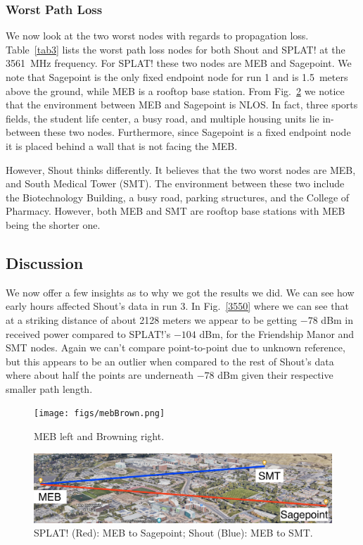 \subsubsection{Worst Path Loss}
We now look at the two worst nodes with regards to propagation loss. Table~\ref{tab3} lists the worst path loss nodes for both 
Shout and SPLAT! at the 3561~MHz frequency. For SPLAT! these two nodes are MEB and Sagepoint. We note that Sagepoint 
is the only fixed endpoint node for run 1 and is 1.5~meters above the ground, while MEB is a rooftop base station. From 
Fig.~\ref{worst} we notice that the environment between MEB and Sagepoint is NLOS. In fact, three sports fields, the student
life center, a busy road, and multiple housing units lie in-between these two nodes. Furthermore, since Sagepoint is a 
fixed endpoint node it is placed behind a wall that is not facing the MEB. 

However, Shout thinks differently. It believes that the two worst nodes are MEB, and South Medical Tower (SMT). The environment
between these two include the Biotechnology Building, a busy road, parking structures, and the College of Pharmacy.
However, both MEB and SMT are rooftop base stations with MEB being the shorter one. 

\subsection{Discussion}
We now offer a few insights as to why we got the results we did. We can see how early hours affected Shout's data in run 3. 
In Fig.~\ref{3550} where we can see that at a striking distance of about 2128 meters we appear to be getting $-78$ dBm 
in received power compared to SPLAT!'s $-104$ dBm, for the Friendship Manor and SMT nodes. Again we can't compare 
point-to-point due to unknown reference, but this appears to be an outlier
when compared to the rest of Shout's data where 
about half the points are underneath $-78$ dBm given their respective smaller path length.

\begin{figure}[htbp]
\centerline{\texttt{[image: figs/mebBrown.png]}}
\caption{MEB left and Browning right.}
\label{mebBrown}
\vspace{-3mm}
\end{figure}

\begin{figure}[htbp]
\centerline{\includegraphics[width=0.9\columnwidth]{figs/worst.png}}
\caption{SPLAT! (Red): MEB to Sagepoint; Shout (Blue): MEB to SMT.}
\label{worst}
\vspace{-3mm}
\end{figure}

